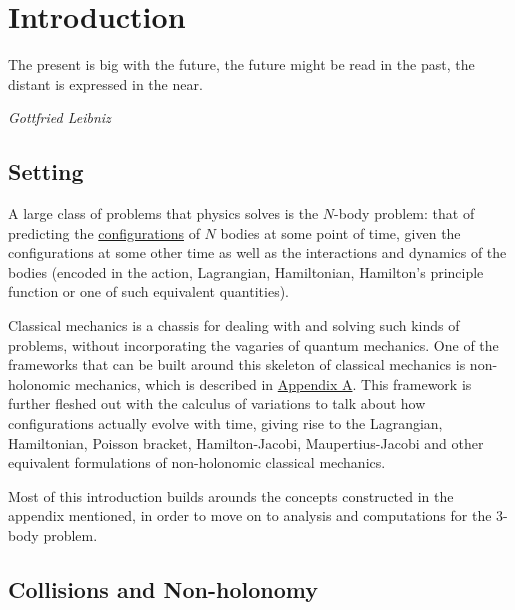 \documentclass[oneside]{book}
\begin{document}
\tableofcontents
\newpage


\chapter{Introduction}

\epigraph{The present is big with the future, the future might be read in the past, the distant is expressed in the near.}{\textit{Gottfried Leibniz}}

\section{Setting}

A large class of problems that physics solves is the $N$-body problem: that of predicting the \hyperref[configuration_space]{configurations} of $N$ bodies at some point of time, given the configurations at some other time as well as the interactions and dynamics of the bodies (encoded in the action, Lagrangian, Hamiltonian, Hamilton's principle function or one of such equivalent quantities).

Classical mechanics is a chassis for dealing with and solving such kinds of problems, without incorporating the vagaries of quantum mechanics. One of the frameworks that can be built around this skeleton of classical mechanics is non-holonomic mechanics, which is described in \hyperref[appendix_A]{Appendix A}. This framework is further fleshed out with the calculus of variations to talk about how configurations actually evolve with time, giving rise to the Lagrangian, Hamiltonian, Poisson bracket, Hamilton-Jacobi, Maupertius-Jacobi and other equivalent formulations of non-holonomic classical mechanics.

Most of this introduction builds arounds the concepts constructed in the appendix mentioned, in order to move on to analysis and computations for the 3-body problem.

\newpage
\section{Collisions and Non-holonomy}
\label{avoiding_collisions}
\end{document}
